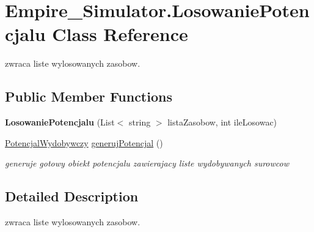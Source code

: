 \hypertarget{class_empire___simulator_1_1_losowanie_potencjalu}{\section{Empire\+\_\+\+Simulator.\+Losowanie\+Potencjalu Class Reference}
\label{class_empire___simulator_1_1_losowanie_potencjalu}
}


zwraca liste wylosowanych zasobow.  


\subsection*{Public Member Functions}
\begin{DoxyCompactItemize}
\item 
\hypertarget{class_empire___simulator_1_1_losowanie_potencjalu_aeb24073a8ce0e9f26910fc099c8a1614}{{\bfseries Losowanie\+Potencjalu} (List$<$ string $>$ lista\+Zasobow, int ile\+Losowac)}\label{class_empire___simulator_1_1_losowanie_potencjalu_aeb24073a8ce0e9f26910fc099c8a1614}

\item 
\hyperlink{class_empire___simulator_1_1_potencjal_wydobywczy}{Potencjal\+Wydobywczy} \hyperlink{class_empire___simulator_1_1_losowanie_potencjalu_a4be2856bb8626faddeebd1d691da1b42}{generuj\+Potencjal} ()
\begin{DoxyCompactList}\small\item\em generuje gotowy obiekt potencjalu zawierajacy liste wydobywanych surowcow \end{DoxyCompactList}\end{DoxyCompactItemize}


\subsection{Detailed Description}
zwraca liste wylosowanych zasobow. 



